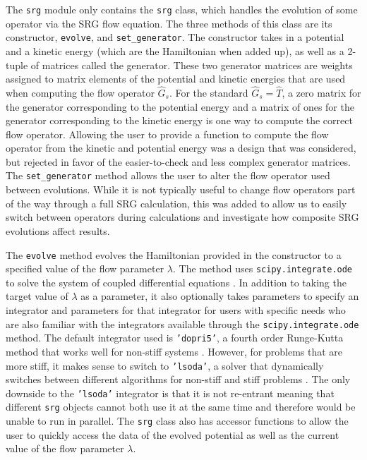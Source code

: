The \texttt{srg} module only contains the \texttt{srg} class, which handles the evolution of some operator via the SRG flow equation. The three methods of this class are its constructor, \texttt{evolve}, and \texttt{set\_generator}. The constructor takes in a potential and a kinetic energy (which are the Hamiltonian when added up), as well as a 2-tuple of matrices called the generator. These two generator matrices are weights assigned to matrix elements of the potential and kinetic energies that are used when computing the flow operator $\hat{G}_s$. For the standard $\hat{G}_s = \hat{T}$, a zero matrix for the generator corresponding to the potential energy and a matrix of ones for the generator corresponding to the kinetic energy is one way to compute the correct flow operator. Allowing the user to provide a function to compute the flow operator from the kinetic and potential energy was a design that was considered, but rejected in favor of the easier-to-check and less complex generator matrices. The \texttt{set\_generator} method allows the user to alter the flow operator used between evolutions. While it is not typically useful to change flow operators part of the way through a full SRG calculation, this was added to allow us to easily switch between operators during calculations and investigate how composite SRG evolutions affect results.

The \texttt{evolve} method evolves the Hamiltonian provided in the constructor to a specified value of the flow parameter $\lambda$. The method uses \texttt{scipy.integrate.ode} to solve the system of coupled differential equations \cite{scipyODE}. In addition to taking the target value of $\lambda$ as a parameter, it also optionally takes parameters to specify an integrator and parameters for that integrator for users with specific needs who are also familiar with the integrators available through the \texttt{scipy.integrate.ode} method. The default integrator used is \texttt{'dopri5'}, a fourth order Runge-Kutta method that works well for non-stiff systems \cite{hairer2008solving}. However, for problems that are more stiff, it makes sense to switch to \texttt{'lsoda'}, a solver that dynamically switches between different algorithms for non-stiff and stiff problems \cite{hindmarsh1983odepack}. The only downside to the \texttt{'lsoda'} integrator is that it is not re-entrant meaning that different \texttt{srg} objects cannot both use it at the same time and therefore would be unable to run in parallel. The \texttt{srg} class also has accessor functions to allow the user to quickly access the data of the evolved potential as well as the current value of the flow parameter $\lambda$.

